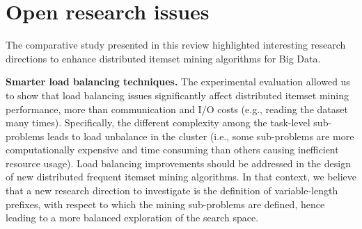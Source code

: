 \documentclass[preprint,review,12pt]{elsarticle}
\begin{document}
\section{Open research issues}
\label{openissues}
%



The comparative study presented in this review highlighted interesting research directions to enhance distributed itemset mining algorithms for Big Data.


\textbf{Smarter load balancing techniques.} 
The experimental evaluation allowed us to show that load balancing issues significantly affect distributed itemset mining performance, more than communication and I/O costs (e.g., reading the dataset many times). 
Specifically, the different complexity among the task-level sub-problems leads to load unbalance in the cluster 
(i.e., some sub-problems are more computationally expensive and time consuming than others causing inefficient resource usage).
Load balancing improvements should be addressed in the design of new distributed frequent itemset mining algorithms. 
In that context, we believe that a new research direction to investigate is the definition of variable-length prefixes, 
with respect to which the mining sub-problems are defined, 
hence leading to a more balanced exploration of the search space. 
\end{document}
